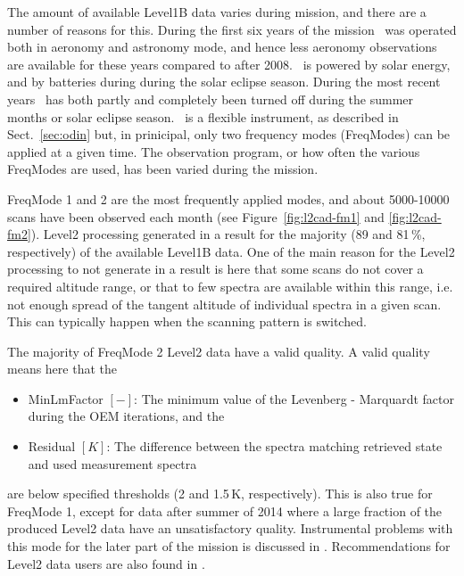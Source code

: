 The amount of available Level1B data varies during mission,
and there are a number of reasons for this.
During the first six years of the mission \smr\ was operated
both in aeronomy and astronomy mode, and hence less
aeronomy observations are available for these years
compared to after 2008. 
\smr\ is powered by solar energy, and by batteries during 
during the solar eclipse season.
During the most recent years \smr\ has both partly and completely
been turned off during the summer months or solar eclipse season.
\smr\ is a flexible instrument, as described in Sect.~\ref{sec:odin}
but, in prinicipal, only two frequency modes (FreqModes)
can be applied at a given time. The observation program, or how
often the various FreqModes are used, has been varied during the
mission.

%

FreqMode 1 and 2 are the most frequently applied modes, and
about 5000-10000 scans have been observed each month
(see Figure~\ref{fig:l2cad-fm1} and \ref{fig:l2cad-fm2}). Level2 processing
generated in a result for the majority (89 and 81\,\%, respectively) of
the available Level1B data. One of the main reason for the
Level2 processing to not generate in a result
is here that some scans do not cover a required
altitude range, or that to few spectra are available within this range,
i.e. not enough spread of the tangent altitude of individual spectra
in a given scan. This can typically happen when the scanning pattern
is switched.
 
The majority of FreqMode 2 Level2 data have a valid quality.
A valid quality means here that the 
\begin{itemize}

  \item MinLmFactor \([-]\): The minimum value of the Levenberg - Marquardt factor during the OEM iterations, and the

  \item Residual \([K]\):  The difference between the spectra matching retrieved state and
   used measurement spectra

\end{itemize}
are below specified thresholds (2 and 1.5\,K, respectively).
This is also true for FreqMode 1, except for data after summer
of 2014 where a large fraction of the produced Level2 data
have an unsatisfactory quality. Instrumental problems
with this mode for the later part of the mission is discussed
in \cite{pver}. 
Recommendations for Level2 data users are also found in
\cite{pver}.


